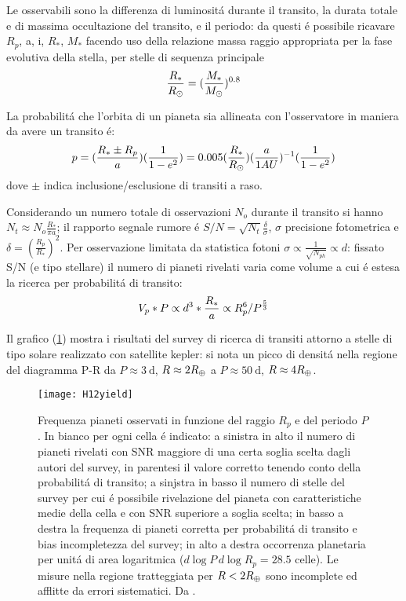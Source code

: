 Le osservabili sono la differenza di luminosit\'a durante il transito, la durata totale e di massima occultazione del transito, e il periodo: da questi \'e possibile ricavare $R_p$, a, i, $R_*$, $M_*$ facendo uso della relazione massa raggio appropriata per la fase evolutiva della stella, per stelle di sequenza principale
\begin{equation}
\frac{R_*}{R_{\odot}{}}=(\frac{M_*}{M_{\odot}{}})^{0.8}
\end{equation}

La probabilit\'a che l'orbita di un pianeta sia allineata con l'osservatore in maniera da avere un transito \'e:
\begin{equation}
p=(\frac{R_*\pm R_p}{a})(\frac{1}{1-e^2})=0.005(\frac{R_*}{R_{\odot}{}})(\frac{a}{1AU})^{-1}(\frac{1}{1-e^2})
\end{equation}
dove $\pm$ indica inclusione/esclusione di transiti a raso.

Considerando un numero totale di osservazioni $N_o$ durante il transito si hanno $N_t\approx N_o\frac{R_*}{\pi a}$; il rapporto segnale rumore \'e $S/N=\sqrt{N_t}\frac{\delta}{\sigma}$, $\sigma$ precisione fotometrica e $\delta=(\frac{R_p}{R_*})^2$. Per osservazione limitata da statistica fotoni $\sigma\propto\frac{1}{\sqrt{N_{ph}}}\propto d$: fissato S/N (e tipo stellare) il numero di pianeti rivelati varia come volume a cui \'e estesa la ricerca per probabilit\'a di transito:
\begin{equation}
V_p*P\propto d^3*\frac{R_*}{a}\propto R_p^6/P^{\frac{5}{3}}
\end{equation}

Il grafico (\ref{fig:H12yield}) mostra i risultati del survey di ricerca di transiti attorno a stelle di tipo solare realizzato con satellite kepler: si nota un picco di densit\'a nella regione del diagramma P-R da $P\approx\SI{3}{\day}$, $R\approx2R_{\oplus}$ a $P\approx\SI{50}{\day}$, $R\approx4R_{\oplus}$.

\begin{figure}[!ht]
	\centering
	\texttt{[image: H12yield]}
	\caption{Frequenza pianeti osservati in funzione del raggio $R_p$ e del periodo $P$. In bianco per ogni cella \'e indicato: a sinistra in alto il numero di pianeti rivelati con SNR maggiore di una certa soglia scelta dagli autori del survey, in parentesi il valore corretto tenendo conto della probabilit\'a di transito; a sinjstra in basso il numero di stelle del survey per cui \'e possibile rivelazione del pianeta con caratteristiche medie della cella e con SNR superiore a soglia scelta; in basso a destra la frequenza di pianeti corretta per probabilit\'a di transito e bias incompletezza del survey; in alto a destra occorrenza planetaria per unit\'a di area logaritmica ($d\log{P}\,d\log{R_p}=28.5$ celle). Le misure nella regione tratteggiata per $R<2R_{\oplus}{}$ sono incomplete ed afflitte da errori sistematici. Da \cite{howard2012planet}.}\label{fig:H12yield}
\end{figure}

